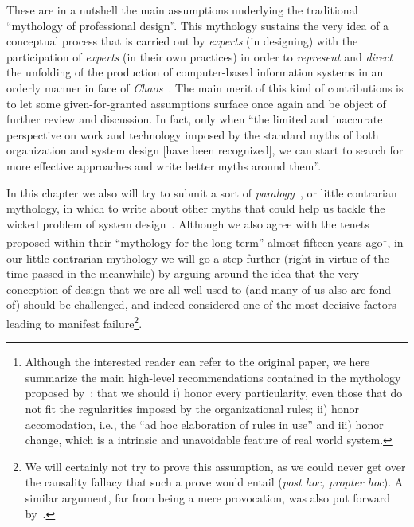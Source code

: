 \documentclass{article}
\begin{document}
These are in a nutshell the main assumptions underlying the traditional ``mythology of professional design''. This mythology sustains the very idea of a conceptual process that is carried out by \emph{experts} (in designing) with the participation of \emph{experts} (in their own practices) in order to \emph{represent} and \emph{direct} the unfolding of the production of computer-based information systems in an orderly manner in face of \emph{Chaos}~\citep{vv._aa._extreme_2001}. The main merit of this kind of contributions is to let some given-for-granted assumptions surface once again and be object of further review and discussion. In fact, only when ``the limited and inaccurate perspective on work and technology imposed by the standard myths of both organization and system design [have been recognized], we can start to search
for more effective approaches and write better myths around them''.

In this chapter we also will try to submit a sort of \emph{paralogy}~\citep{lyotard_postmodern_1986}, or little contrarian mythology, in which to write about other myths that could help us tackle the wicked problem of system design~\citep[p. 4]{fitzpatrick_locales_2003}. Although we also agree with the tenets~\citet{harris_better_1999} proposed within their ``mythology for the long term'' almost fifteen years ago\footnote{Although the interested reader can refer to the original paper, we here summarize the main high-level recommendations contained in the mythology proposed by~\citet{harris_better_1999}: that we should i) honor every particularity, even those that do not fit the regularities imposed by the organizational rules; ii) honor accomodation, i.e., the ``ad hoc elaboration of rules in use'' and iii) honor change, which is a intrinsic and unavoidable feature of real world system.}, in our little contrarian mythology we will go a step further (right in virtue of the time passed in the meanwhile) by arguing around the idea that the very conception of design that we are all well used to (and many of us also are fond of) 
should be challenged, and indeed considered one of the most decisive factors leading to manifest failure\footnote{We will certainly not try to prove this assumption, as we could never get over the causality fallacy that such a prove would entail (\emph{post hoc, propter hoc}). A similar argument, far from being a mere provocation, was also put forward by~\citet{bryant_its_2000}.}. 
\end{document}

